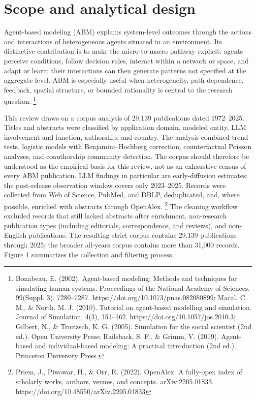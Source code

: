 \section{Scope and analytical design}

Agent-based modeling (ABM) explains system-level outcomes through the actions and interactions of heterogeneous agents situated in an environment. Its distinctive contribution is to make the micro-to-macro pathway explicit: agents perceive conditions, follow decision rules, interact within a network or space, and adapt or learn; their interactions can then generate patterns not specified at the aggregate level. ABM is especially useful when heterogeneity, path dependence, feedback, spatial structure, or bounded rationality is central to the research question. \footnote{Bonabeau, E. (2002). Agent-based modeling: Methods and techniques for simulating human systems. Proceedings of the National Academy of Sciences, 99(Suppl. 3), 7280–7287. https://doi.org/10.1073/pnas.082080899; Macal, C. M., \& North, M. J. (2010). Tutorial on agent-based modelling and simulation. Journal of Simulation, 4(3), 151–162. https://doi.org/10.1057/jos.2010.3; Gilbert, N., \& Troitzsch, K. G. (2005). Simulation for the social scientist (2nd ed.). Open University Press; Railsback, S. F., \& Grimm, V. (2019). Agent-based and individual-based modeling: A practical introduction (2nd ed.). Princeton University Press.}

This review draws on a corpus analysis of 29,139 publications dated 1972–2025. Titles and abstracts were classified by application domain, modeled entity, LLM involvement and function, authorship, and country. The analysis combined trend tests, logistic models with Benjamini–Hochberg correction, counterfactual Poisson analyses, and coauthorship community detection. The corpus should therefore be understood as the empirical basis for this review, not as an exhaustive census of every ABM publication. LLM findings in particular are early-diffusion estimates: the post-release observation window covers only 2023–2025. Records were collected from Web of Science, PubMed, and DBLP, deduplicated, and, where possible, enriched with abstracts through OpenAlex. \footnote{Priem, J., Piwowar, H., \& Orr, R. (2022). OpenAlex: A fully-open index of scholarly works, authors, venues, and concepts. arXiv:2205.01833. https://doi.org/10.48550/arXiv.2205.01833} The cleaning workflow excluded records that still lacked abstracts after enrichment, non-research publication types (including editorials, correspondence, and reviews), and non-English publications. The resulting strict corpus contains 29,139 publications through 2025; the broader all-years corpus contains more than 31,000 records. Figure 1 summarizes the collection and filtering process.

